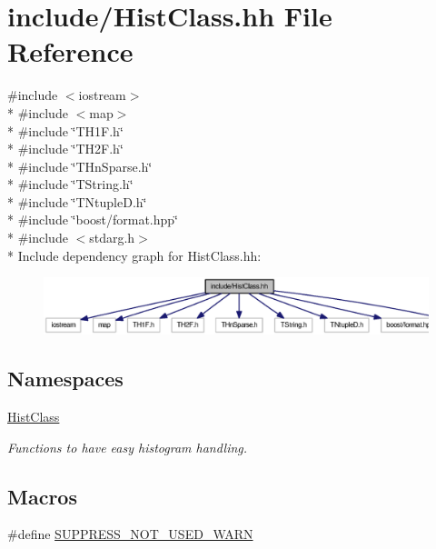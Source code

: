 \section{include/\-Hist\-Class.hh File Reference}
\label{HistClass_8hh}
{\ttfamily \#include $<$iostream$>$}\\*
{\ttfamily \#include $<$map$>$}\\*
{\ttfamily \#include \char`\"{}T\-H1\-F.\-h\char`\"{}}\\*
{\ttfamily \#include \char`\"{}T\-H2\-F.\-h\char`\"{}}\\*
{\ttfamily \#include \char`\"{}T\-Hn\-Sparse.\-h\char`\"{}}\\*
{\ttfamily \#include \char`\"{}T\-String.\-h\char`\"{}}\\*
{\ttfamily \#include \char`\"{}T\-Ntuple\-D.\-h\char`\"{}}\\*
{\ttfamily \#include \char`\"{}boost/format.\-hpp\char`\"{}}\\*
{\ttfamily \#include $<$stdarg.\-h$>$}\\*
Include dependency graph for Hist\-Class.\-hh\-:
\nopagebreak
\begin{figure}[H]
\begin{center}
\leavevmode
\includegraphics[width=350pt]{HistClass_8hh__incl}
\end{center}
\end{figure}
\subsection*{Namespaces}
\begin{DoxyCompactItemize}
\item 
\hyperlink{namespaceHistClass}{Hist\-Class}
\begin{DoxyCompactList}\small\item\em Functions to have easy histogram handling. \end{DoxyCompactList}\end{DoxyCompactItemize}
\subsection*{Macros}
\begin{DoxyCompactItemize}
\item 
\#define \hyperlink{HistClass_8hh_a85edd6ac47f5ea2970c76af20855738c}{S\-U\-P\-P\-R\-E\-S\-S\-\_\-\-N\-O\-T\-\_\-\-U\-S\-E\-D\-\_\-\-W\-A\-R\-N}
\end{DoxyCompactItemize}
